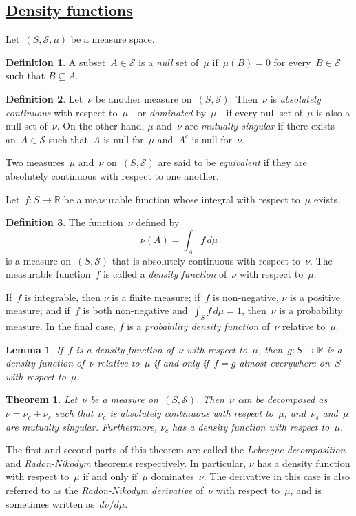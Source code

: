 \documentclass[11pt,a4paper]{article}
\newcommand\mb[1]{\mathbb{#1}}                   %
\newcommand\mc[1]{\mathcal{#1}}                  %
\newtheorem{lem}{Lemma}
\newtheorem{thm}{Theorem}
\theoremstyle{definition}
\newtheorem{defn}{Definition}
\begin{document}
\subsection %
  {\href{http://www.randomservices.org/random/dist/Density.html}
  {Density functions}}

Let~$(S,\mc{S},\mu)$ be a measure space.
\begin{defn}
A subset~$A \in \mc{S}$ is a \emph{null} set of~$\mu$ if~$\mu(B) = 0$ for
every~$B \in \mc{S}$ such that $B \subseteq A$.
\end{defn}
\begin{defn}
Let~$\nu$ be another measure on~$(S,\mc{S})$. Then~$\nu$ is \emph{absolutely
continuous} with respect to~$\mu$---or \emph{dominated} by~$\mu$---if every null
set of~$\mu$ is also a null set of~$\nu$. On the other hand, $\mu$ and~$\nu$ are
\emph{mutually singular} if there exists an~$A \in \mc{S}$ such that~$A$ is null
for~$\mu$ and~$A^c$ is null for~$\nu$.
\end{defn}
Two measures~$\mu$ and~$\nu$ on~$(S,\mc{S})$ are said to be \emph{equivalent} if
they are absolutely continuous with respect to one another.

Let~$f\colon S \to \mb{R}$ be a measurable function whose integral with respect
to~$\mu$ exists.
\begin{defn}
The function~$\nu$ defined by
\[ \nu(A) = \int_A f\,d\mu \]
is a measure on~$(S,\mc{S})$ that is absolutely continuous with respect
to~$\nu$. The measurable function~$f$ is called a \emph{density function}
of~$\nu$ with respect to~$\mu$.
\end{defn}
If~$f$ is integrable, then $\nu$ is a finite measure; if~$f$ is non-negative,
$\nu$ is a positive measure; and if~$f$ is both non-negative and~$\int_S
f\,d\mu = 1$, then~$\nu$ is a probability measure. In the final case, $f$ is a
\emph{probability density function} of~$\nu$ relative to~$\mu$.

\begin{lem}
If~$f$ is a density function of~$\nu$ with respect to~$\mu$, then~$g\colon S \to
\mb{R}$ is a density function of~$\nu$ relative to~$\mu$ if and only if~$f = g$
almost everywhere on~$S$ with respect to~$\mu$.
\end{lem}

\begin{thm}
Let~$\nu$ be a measure on~$(S,\mc{S})$. Then~$\nu$ can be decomposed as~$\nu =
\nu_c + \nu_s$ such that~$\nu_c$ is absolutely continuous with respect to~$\mu$,
and~$\nu_s$ and~$\mu$ are mutually singular. Furthermore, $\nu_c$ has a density
function with respect to~$\mu$.
\end{thm}
The first and second parts of this theorem are called the \emph{Lebesgue
decomposition} and \emph{Radon-Nikodym} theorems respectively. In particular,
$\nu$ has a density function with respect to~$\mu$ if and only if~$\mu$
dominates~$\nu$. The derivative in this case is also referred to as the
\emph{Radon-Nikodym derivative} of~$\nu$ with respect to~$\mu$, and is sometimes
written as~$d\nu/d\mu$.
\end{document}
